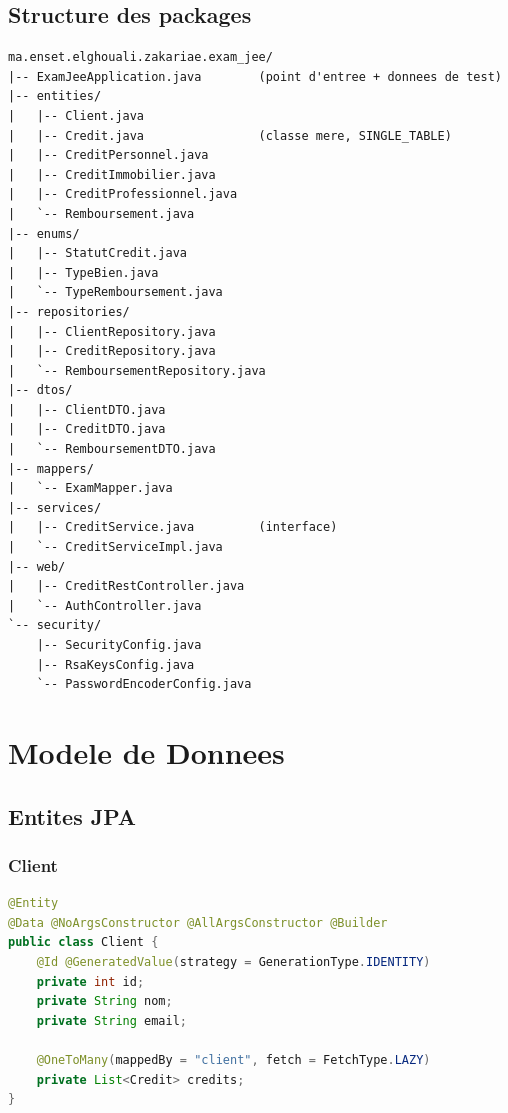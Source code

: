 \documentclass[12pt,a4paper]{report}
\begin{document}
\section{Structure des packages}

\begin{verbatim}
ma.enset.elghouali.zakariae.exam_jee/
|-- ExamJeeApplication.java        (point d'entree + donnees de test)
|-- entities/
|   |-- Client.java
|   |-- Credit.java                (classe mere, SINGLE_TABLE)
|   |-- CreditPersonnel.java
|   |-- CreditImmobilier.java
|   |-- CreditProfessionnel.java
|   `-- Remboursement.java
|-- enums/
|   |-- StatutCredit.java
|   |-- TypeBien.java
|   `-- TypeRemboursement.java
|-- repositories/
|   |-- ClientRepository.java
|   |-- CreditRepository.java
|   `-- RemboursementRepository.java
|-- dtos/
|   |-- ClientDTO.java
|   |-- CreditDTO.java
|   `-- RemboursementDTO.java
|-- mappers/
|   `-- ExamMapper.java
|-- services/
|   |-- CreditService.java         (interface)
|   `-- CreditServiceImpl.java
|-- web/
|   |-- CreditRestController.java
|   `-- AuthController.java
`-- security/
    |-- SecurityConfig.java
    |-- RsaKeysConfig.java
    `-- PasswordEncoderConfig.java
\end{verbatim}

\chapter{Modele de Donnees}

\section{Entites JPA}

\subsection{Client}

\begin{lstlisting}[language=Java, caption={Entite Client}]
@Entity
@Data @NoArgsConstructor @AllArgsConstructor @Builder
public class Client {
    @Id @GeneratedValue(strategy = GenerationType.IDENTITY)
    private int id;
    private String nom;
    private String email;

    @OneToMany(mappedBy = "client", fetch = FetchType.LAZY)
    private List<Credit> credits;
}
\end{lstlisting}
\end{document}
